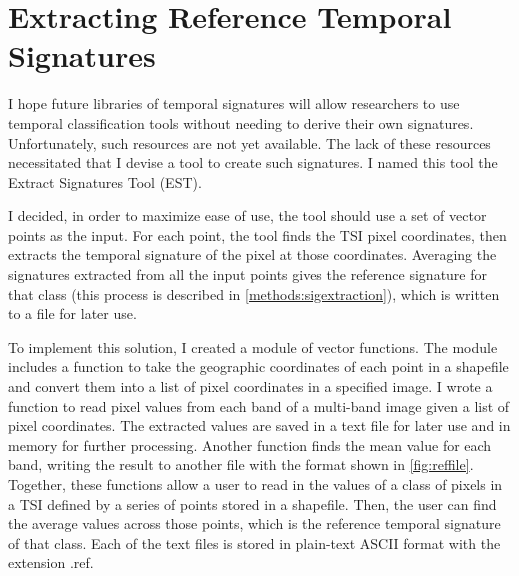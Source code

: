 \section{Extracting Reference Temporal Signatures}
\label{appendix:tools:extract}

I hope future libraries of temporal signatures will allow researchers to use temporal classification tools without needing to derive their own signatures. Unfortunately, such resources are not yet available. The lack of these resources necessitated that I devise a tool to create such signatures. I named this tool the Extract Signatures Tool (EST).

I decided, in order to maximize ease of use, the tool should use a set of vector points as the input. For each point, the tool finds the TSI pixel coordinates, then extracts the temporal signature of the pixel at those coordinates. Averaging the signatures extracted from all the input points gives the reference signature for that class (this process is described in \autoref{methods:sigextraction}), which is written to a file for later use.

To implement this solution, I created a module of vector functions. The module includes a function to take the geographic coordinates of each point in a shapefile and convert them into a list of pixel coordinates in a specified image. I wrote a function to read pixel values from each band of a multi-band image given a list of pixel coordinates. The extracted values are saved in a text file for later use and in memory for further processing. Another function finds the mean value for each band, writing the result to another file with the format shown in \autoref{fig:reffile}. Together, these functions allow a user to read in the values of a class of pixels in a TSI defined by a series of points stored in a shapefile. Then, the user can find the average values across those points, which is the reference temporal signature of that class. Each of the text files is stored in plain-text ASCII format with the extension .ref.

